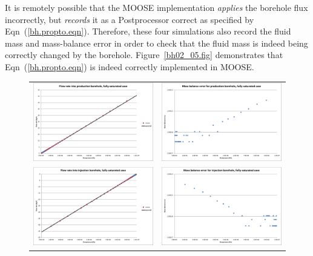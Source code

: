 \documentclass[]{scrreprt}
\begin{document}
It is remotely possible that the MOOSE implementation {\em applies}
the borehole flux incorrectly, but {\em records} it as a Postprocessor
correct as specified by Eqn~(\ref{bh.propto.eqn}).  Therefore, these
four simulations also record the fluid mass and mass-balance error in
order to check that the fluid mass is indeed being correctly changed
by the borehole.  Figure~\ref{bh02_05.fig} demonstrates that
Eqn~(\ref{bh.propto.eqn}) is indeed correctly implemented in MOOSE.

\begin{figure}[htb]
\centering
\begin{tabular}{cc}
\includegraphics[width=7cm]{bh02.eps} &
\includegraphics[width=7cm]{bh02_mass_balance.eps} \\
\includegraphics[width=7cm]{bh03.eps} &
\includegraphics[width=7cm]{bh03_mass_balance.eps} \\

\end{tabular}
\end{figure}
\end{document}
